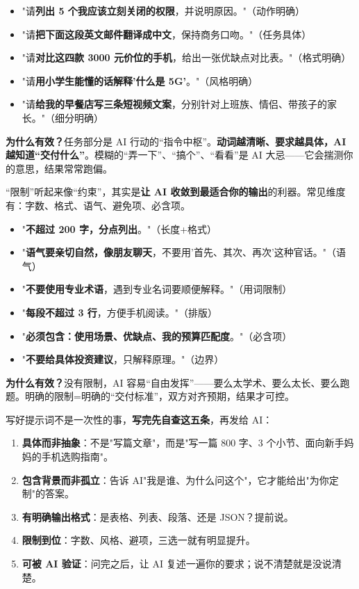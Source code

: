 \begin{itemize}
  \item "请\textbf{列出 5 个我应该立刻关闭的权限}，并说明原因。"（动作明确）
  \item "请\textbf{把下面这段英文邮件翻译成中文}，保持商务口吻。"（任务具体）
  \item "请\textbf{对比这四款 3000 元价位的手机}，给出一张优缺点对比表。"（格式明确）
  \item "请\textbf{用小学生能懂的话解释'什么是 5G'}。"（风格明确）
  \item "请\textbf{给我的早餐店写三条短视频文案}，分别针对上班族、情侣、带孩子的家长。"（细分明确）
\end{itemize}

\textbf{为什么有效？}任务部分是 AI 行动的“指令中枢”。\textbf{动词越清晰、要求越具体，AI 越知道“交付什么”}。模糊的“弄一下”、“搞个”、“看看”是 AI 大忌——它会揣测你的意思，结果常常跑偏。


“限制”听起来像“约束”，其实是\textbf{让 AI 收敛到最适合你的输出}的利器。常见维度有：字数、格式、语气、避免项、必含项。


\begin{itemize}
  \item "\textbf{不超过 200 字，分点列出}。"（长度+格式）
  \item "\textbf{语气要亲切自然，像朋友聊天}，不要用'首先、其次、再次'这种官话。"（语气）
  \item "\textbf{不要使用专业术语}，遇到专业名词要顺便解释。"（用词限制）
  \item "\textbf{每段不超过 3 行}，方便手机阅读。"（排版）
  \item "\textbf{必须包含：使用场景、优缺点、我的预算匹配度}。"（必含项）
  \item "\textbf{不要给具体投资建议}，只解释原理。"（边界）
\end{itemize}

\textbf{为什么有效？}没有限制，AI 容易“自由发挥”——要么太学术、要么太长、要么跑题。明确的限制=明确的“交付标准”，双方对齐预期，结果才可控。


写好提示词不是一次性的事，\textbf{写完先自查这五条}，再发给 AI：

\begin{enumerate}
  \item \textbf{具体而非抽象}：不是"写篇文章"，而是"写一篇 800 字、3 个小节、面向新手妈妈的手机选购指南"。
  \item \textbf{包含背景而非孤立}：告诉 AI"我是谁、为什么问这个"，它才能给出"为你定制"的答案。
  \item \textbf{有明确输出格式}：是表格、列表、段落、还是 JSON？提前说。
  \item \textbf{限制到位}：字数、风格、避项，三选一就有明显提升。
  \item \textbf{可被 AI 验证}：问完之后，让 AI 复述一遍你的要求；说不清楚就是没说清楚。
\end{enumerate}

